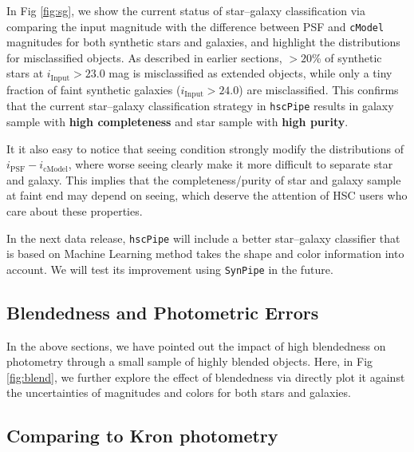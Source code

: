 \documentclass[useamsfonts]{pasj01}
\def\hscpipe{\texttt{hscPipe}}
\def\synpipe{\texttt{SynPipe}}
\def\cmodel{\texttt{cModel}}
\begin{document}
    In Fig \ref{fig:sg}, we show the current status of star--galaxy classification  
    via comparing the input magnitude with the difference between PSF and \cmodel{} 
    magnitudes for both synthetic stars and galaxies, and highlight the distributions 
    for misclassified objects. 
    As described in earlier sections, $>20$\% of synthetic stars at 
    $i_{\mathrm{Input}}>23.0$ mag is misclassified as extended objects, while only a 
    tiny fraction of faint synthetic galaxies ($i_{\mathrm{Input}}>24.0$) are 
    misclassified. 
    This confirms that the current star--galaxy classification strategy in \hscpipe{}
    results in galaxy sample with \textbf{high completeness} and star sample 
    with \textbf{high purity}.
    
    It it also easy to notice that seeing condition strongly modify the distributions 
    of $i_{\mathrm{PSF}}-i_{\mathrm{cModel}}$, where worse seeing clearly make it 
    more difficult to separate star and galaxy.  
    This implies that the completeness/purity of star and galaxy sample at faint end
    may depend on seeing, which deserve the attention of HSC users who care about 
    these properties.      
    
    In the next data release, \hscpipe{} will include a better star--galaxy classifier
    that is based on Machine Learning method takes the shape and color information 
    into account. 
    We will test its improvement using \synpipe{} in the future.
    
\subsection{Blendedness and Photometric Errors}
    \label{ssec:blendedness}

    In the above sections, we have pointed out the impact of high blendedness on 
    photometry through a small sample of highly blended objects.  
    Here, in Fig \ref{fig:blend}, we further explore the effect of blendedness via 
    directly plot it against the uncertainties of magnitudes and colors for both stars 
    and galaxies. 
    
\subsection{Comparing to Kron photometry}
\end{document}
